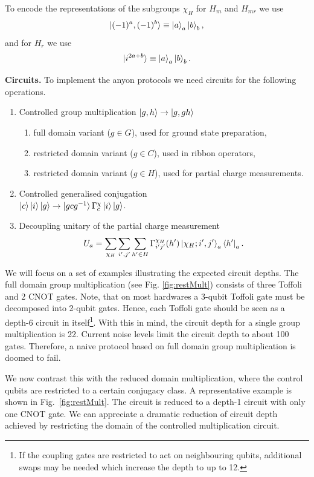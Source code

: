 \documentclass[a4paper,twocolumn,11pt]{quantumarticle}
\begin{document}
To encode the representations of the subgroups $\chi_H$ for $H_m$ and $H_{mr}$ we use
\begin{equation}
    \ket{(-1)^a,(-1)^b} \equiv \ket{a}_a\ket{b}_b,
\end{equation}
and for $H_{r}$ we use
\begin{equation}
    \ket{i^{2a+b}} \equiv \ket{a}_a\ket{b}_b.
\end{equation}



\textbf{Circuits.} To implement the anyon protocols we need circuits for the following operations.
\begin{enumerate}
    \item Controlled group multiplication $\ket{g, h} \rightarrow \ket{g, gh}$  \begin{enumerate}
        \item full domain variant ($g \in G$), used for ground state preparation,
        \item restricted domain variant ($g \in C$), used in ribbon operators,
        \item restricted domain variant ($g \in H$), used for partial charge measurements. 
    \end{enumerate}
    \item Controlled generalised conjugation\\ $\ket{c} \ket{i}\ket{g} \rightarrow \ket{gcg^{-1}} \Gamma^\chi_{c} \ket{i}\ket{g}$.
    \item Decoupling unitary of the partial charge measurement $$ U_a = \sum_{\chi_H}\sum_{i', j'}\sum_{h'\in H}  \Gamma^{\chi_H}_{i'j'}(h')  \ket{\chi_H; i', j'}_a\bra{h'}_a. $$
\end{enumerate} 


We will focus on a set of examples illustrating the expected circuit depths. The full domain group multiplication (see Fig. \ref{fig:restMult}) consists of three Toffoli and 2 CNOT gates. Note, that on most hardwares a 3-qubit Toffoli gate must be decomposed into 2-qubit gates. Hence, each Toffoli gate should be seen as a depth-6 circuit in itself\footnote{If the coupling gates are restricted to act on neighbouring qubits, additional swaps may be needed which increase the depth to up to 12.}. With this in mind, the circuit depth for a single group multiplication is 22. Current noise levels limit the circuit depth to about 100 gates. Therefore, a naive protocol based on full domain group multiplication is doomed to fail. 

We now contrast this with the reduced domain multiplication, where the control qubits are restricted to a certain conjugacy class. A representative example is shown in Fig.~\ref{fig:restMult}. The circuit is reduced to a depth-1 circuit with only one CNOT gate. We can appreciate a dramatic reduction of circuit depth achieved by restricting the domain of the controlled multiplication circuit.
\end{document}
